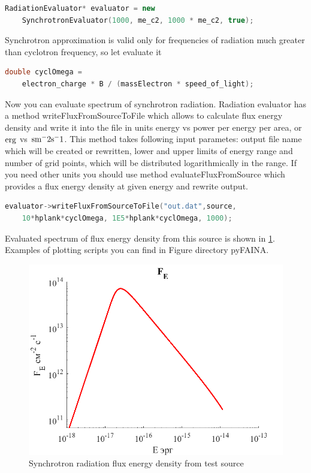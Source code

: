 \begin{lstlisting}[language=c++]
	RadiationEvaluator* evaluator = new 
	SynchrotronEvaluator(1000, me_c2, 1000 * me_c2, true);
\end{lstlisting}

Synchrotron approximation is valid only for frequencies of radiation much greater than cyclotron frequency, so let evaluate it

\begin{lstlisting}[language=c++]
	double cyclOmega = 
	electron_charge * B / (massElectron * speed_of_light);
\end{lstlisting}

Now you can evaluate spectrum of synchrotron radiation. Radiation evaluator has a method writeFluxFromSourceToFile which allows to calculate flux energy density and write it into the file in units energy vs power per energy per area, or $\rm erg$ vs $\rm sm^-2 s^-1$. This method takes following input parametes: output file name which will be created or rewritten, lower and upper limits of energy range and number of grid points, which will be distributed logarithmically in the range. If you need other units you should use method evaluateFluxFromSource which provides a flux energy density at given energy and rewrite output.

\begin{lstlisting}[language=c++]
	evaluator->writeFluxFromSourceToFile("out.dat",source, 
	10*hplank*cyclOmega, 1E5*hplank*cyclOmega, 1000);
\end{lstlisting}


Evaluated spectrum of flux energy density from this source is shown in \ref{example0}. Examples of plotting scripts you can find in Figure directory pyFAINA.
\begin{figure}
	\centering
	\includegraphics[width=12.5 cm]{./fig/example0.png} 
	\caption{Synchrotron radiation flux energy density from test source}
	\label{example0}
\end{figure}

